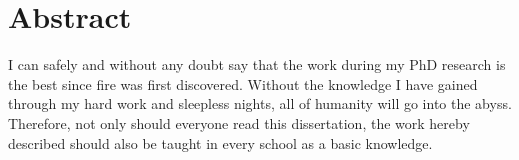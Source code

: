 \chapter*{Abstract}
\thispagestyle{empty}

I can safely and without any doubt say that the work during my PhD research is the best since fire was first discovered.
Without the knowledge I have gained through my hard work and sleepless nights, all of humanity will go into the abyss.
Therefore, not only should everyone read this dissertation, the work hereby described should also be taught in every school as a basic knowledge.